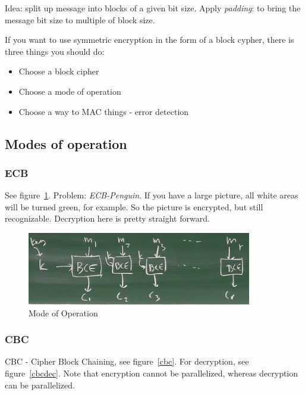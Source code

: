 \documentclass[language=english,number=]{homework}
\begin{document}
    Idea: split up message into blocks of a given bit size.
    Apply \textit{padding}: to bring the message bit size to multiple of block size.

    If you want to use symmetric encryption in the form of a block cypher, there is three things you should do:
    \begin{itemize}
        \item Choose a block cipher
        \item Choose a mode of operation
        \item Choose a way to MAC things - error detection
    \end{itemize}

    \subsection{Modes of operation}
\subsubsection{ECB}
        See figure~\ref{moo1}.
        Problem: \textit{ECB-Penguin}.
        If you have a large picture, all white areas will be turned green, for example.
        So the picture is encrypted, but still recognizable.
        Decryption here is pretty straight forward.

\begin{figure}
    \centering
    \includegraphics[width=\textwidth]{moo1.PNG}
    \caption{Mode of Operation}
    \label{moo1}
\end{figure}

\subsubsection{CBC}
        CBC - Cipher Block Chaining, see figure~\ref{cbc}.
        For decryption, see figure~\ref{cbcdec}.
        Note that encryption cannot be parallelized, whereas decryption can be parallelized.
\end{document}
